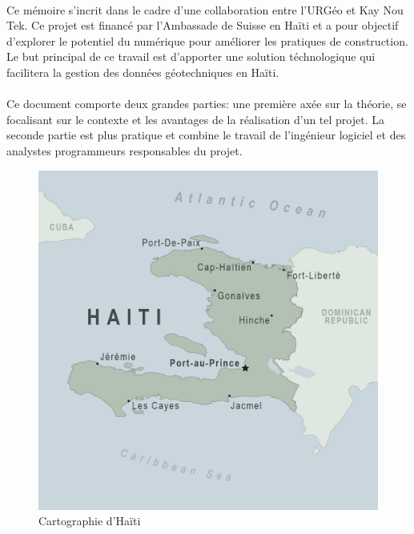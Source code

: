 
    \paragraph{}
    Ce mémoire s'incrit dans le cadre d'une collaboration entre
    l'URGéo et Kay Nou Tek. Ce projet est financé par l’Ambassade
    de Suisse en Haïti et a pour objectif d’explorer le potentiel 
    du numérique pour améliorer les pratiques de construction.
    Le but principal de ce travail est
    d'apporter une solution téchnologique  qui facilitera la 
    gestion des données géotechniques en Haïti.
    \paragraph{}
    Ce document comporte deux grandes parties: une première axée
    sur la théorie, se focalisant sur le contexte et les avantages
    de la réalisation d'un tel projet. La seconde partie est plus pratique
    et combine le travail de l'ingénieur logiciel et des analystes programmeurs responsables
    du projet.
    \begin{figure}
        \centering
        \includegraphics[width=1\textwidth]{images/Contexte/map-haiti.png}
        \caption{Cartographie d'Haïti}
    \end{figure}